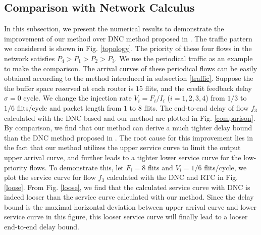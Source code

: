 \documentclass[10pt,journal]{IEEEtran}
\begin{document}
\subsection{Comparison with Network Calculus}\label{dnccmp}
In this subsection, we present the numerical results to demonstrate the improvement of our method over DNC method proposed in \cite{Qian489900}. The traffic pattern we considered is shown in Fig. \ref{topology}. The priority of these four flows in the network satisfies $P_4>P_1>P_2>P_3$. We use the periodical traffic as an example to make the comparison. The arrival curves of these periodical flows can be easily obtained according to the method introduced in subsection \ref{traffic}. Suppose the the buffer space reserved at each router is $15$ flits, and the credit feedback delay $\sigma=0$ cycle. We change the injection rate $V_i=F_i/I_i$ ($i=1,2,3,4$) from $1/3$ to $1/6$ flits/cycle and packet length from $1$ to $8$ flits. The end-to-end delay of flow $f_3$ calculated with the DNC-based and our method are plotted in Fig. \ref{comparison}. By comparison, we find that our method can derive a much tighter delay bound than the DNC method proposed in \cite{Qian489900}. The root cause for this improvement lies in the fact that our method utilizes the upper service curve to limit the output upper arrival curve, and further leads to a tighter lower service curve for the low-priority flows. To demonstrate this, let $F_i=8$ flits and $V_i=1/6$ flits/cycle, we plot the service curve for flow $f_3$ calculated with the DNC and RTC in Fig. \ref{loose}. From Fig. \ref{loose}, we find that the calculated service curve with DNC is indeed looser than the service curve calculated with our method. Since the delay bound is the maximal horizontal deviation between upper arrival curve and lower service curve in this figure, this looser service curve will finally lead to a looser end-to-end delay bound.
\end{document}

